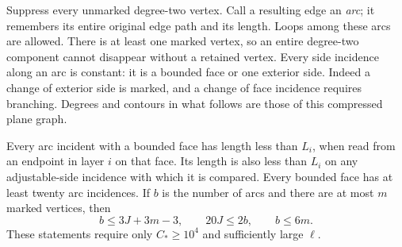 Suppress every unmarked degree-two vertex.  Call a resulting edge an
\emph{arc}; it remembers its entire original edge path and its length.
Loops among these arcs are allowed.  There is at least one marked vertex,
so an entire degree-two component cannot disappear without a retained
vertex.  Every side incidence along an arc is constant: it is a bounded
face or one exterior side.  Indeed a change of exterior side is marked,
and a change of face incidence requires branching.  Degrees and contours
in what follows are those of this compressed plane graph.

\begin{lemma}
\label{geo:arcs}
Every arc incident with a bounded face has length less than $L_i$, when
read from an endpoint in layer $i$ on that face.  Its length is also less
than $L_i$ on any adjustable-side incidence with which it is compared.
Every bounded face has at least twenty arc incidences.  If $b$ is the
number of arcs and there are at most $m$ marked vertices, then
\begin{equation}
 b\le 3J+3m-3,\qquad 20J\le 2b,\qquad b\le 6m.
 \label{geo:euler}
\end{equation}
These statements require only $C_*\ge10^4$ and sufficiently large $\ell$.
\end{lemma}

